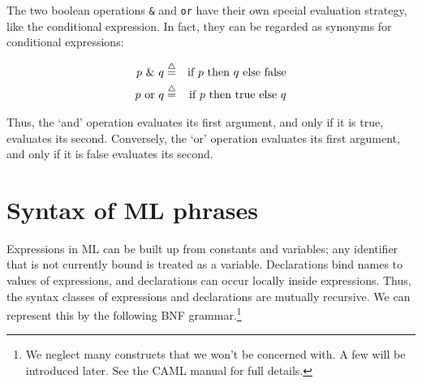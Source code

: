 The two boolean operations {\tt \&} and {\tt or} have their own special
evaluation strategy, like the conditional expression. In fact, they can be
regarded as synonyms for conditional expressions:

\begin{eqnarray*}
p \mbox{ \& } q & \stackrel{\bigtriangleup}{=} & \mbox{if } p \mbox{ then } q \mbox{ else false}  \\
p \mbox{ or } q & \stackrel{\bigtriangleup}{=} & \mbox{if } p \mbox{ then true else } q
\end{eqnarray*}

Thus, the `and' operation evaluates its first argument, and only if it is true,
evaluates its second. Conversely, the `or' operation evaluates its first
argument, and only if it is false evaluates its second.

\section{Syntax of ML phrases}

Expressions in ML can be built up from constants and variables; any identifier
that is not currently bound is treated as a variable. Declarations bind names
to values of expressions, and declarations can occur locally inside
expressions. Thus, the syntax classes of expressions and declarations are
mutually recursive. We can represent this by the following BNF
grammar.\footnote{We neglect many constructs that we won't be concerned with. A
few will be introduced later. See the CAML manual for full details.}

